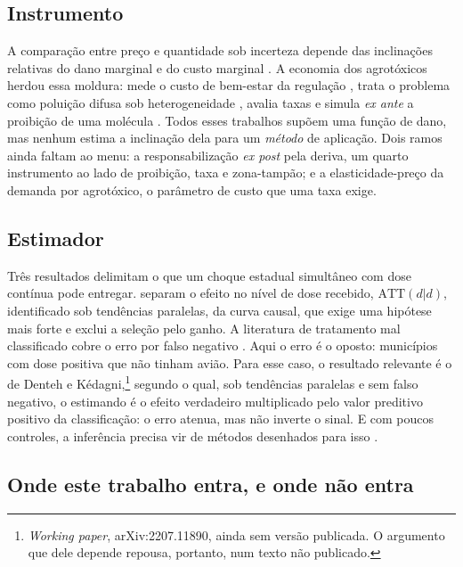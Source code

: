 \subsection{Instrumento}

A comparação entre preço e quantidade sob incerteza depende das inclinações
relativas do dano marginal e do custo marginal \citep{weitzman1974}. A economia
dos agrotóxicos herdou essa moldura: mede o custo de bem-estar da regulação
\citep{lichtenberg1988}, trata o problema como poluição difusa sob
heterogeneidade \citep{helfand1995}, avalia taxas \citep{skevas2012} e simula
\emph{ex ante} a proibição de uma molécula \citep{bocker2020glyphosate,
finger2024europe}. Todos esses trabalhos supõem uma função de dano, mas nenhum
estima a inclinação dela para um \emph{método} de aplicação. Dois ramos ainda
faltam ao menu: a responsabilização \emph{ex post} pela deriva, um quarto
instrumento ao lado de proibição, taxa e zona-tampão; e a elasticidade-preço da
demanda por agrotóxico, o parâmetro de custo que uma taxa exige.

\subsection{Estimador}

Três resultados delimitam o que um choque estadual simultâneo com dose contínua
pode entregar. \citet{callaway2024continuous} separam o efeito no nível de dose
recebido, $\text{ATT}(d|d)$, identificado sob tendências paralelas, da curva
causal, que exige uma hipótese mais forte e exclui a seleção pelo ganho. A
literatura de tratamento mal classificado cobre o erro por falso negativo
\citep{neginegi2025misclassified}. Aqui o erro é o oposto: municípios com dose
positiva que não tinham avião. Para esse caso, o resultado relevante é o de
Denteh e Kédagni,\footnote{\emph{Working paper}, arXiv:2207.11890, ainda sem
versão publicada. O argumento que dele depende repousa, portanto, num texto não
publicado.} segundo o qual, sob tendências paralelas e sem falso negativo, o
estimando é o efeito verdadeiro multiplicado pelo valor preditivo positivo da
classificação: o erro atenua, mas não inverte o sinal. E com poucos controles, a
inferência precisa vir de métodos desenhados para isso
\citep{conley2011,canay2021wild,arkhangelsky2021sdid}.

\subsection{Onde este trabalho entra, e onde não entra}

